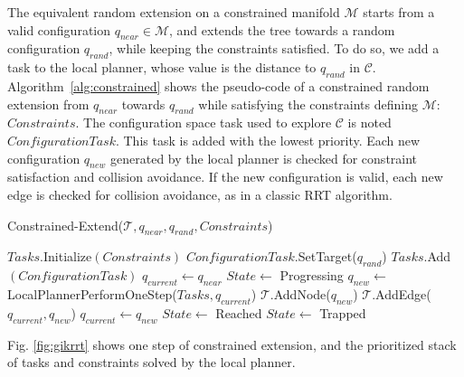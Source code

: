 \documentclass{article}
\begin{document}
The equivalent random  extension on a constrained manifold $\mathcal{M}$
starts from a valid configuration $q_{near} \in \mathcal{M}$, and extends the tree
towards a random configuration $q_{rand}$, while keeping the constraints
satisfied. To do so, we add a task to the local planner, whose value
is the distance to  $q_{rand}$ in $\mathcal{C}$. Algorithm~\ref{alg:constrained}
shows the pseudo-code of a constrained random extension from  $q_{near}$ towards
$q_{rand}$ while satisfying the constraints defining $\mathcal{M}$: $Constraints$.
The configuration space task used to explore $\mathcal{C}$ is 
noted $ConfigurationTask$.   This
task is added with the lowest priority. Each new configuration $q_{new}$ generated by the
local planner  is 
checked for constraint satisfaction and collision 
avoidance. If the new configuration is valid, each new edge is checked for collision
avoidance, as in a classic RRT algorithm.

\begin{algorithm}[h]
  \caption{Constrained-Extend($\mathcal{T},q_{near},q_{rand},Constraints$)}
  \label{alg:constrained}
  \begin{algorithmic}
    \STATE $Tasks.$Initialize$(Constraints)$
    \STATE $ConfigurationTask$.SetTarget($q_{rand}$)
    \STATE $Tasks.$Add$(ConfigurationTask)$
    \STATE $q_{current} \leftarrow q_{near}$
    \STATE $State \leftarrow$ Progressing
    \STATE $q_{new} \leftarrow $ LocalPlannerPerformOneStep($Tasks,q_{current}$)
    \STATE $\mathcal{T}$.AddNode($q_{new}$)
    \STATE $\mathcal{T}$.AddEdge($q_{current},q_{new}$)
    \STATE $q_{current} \leftarrow q_{new}$
    \STATE $State \leftarrow$ Reached
    \ENDIF
    \ELSE 
    \STATE $State \leftarrow$ Trapped
    \ENDIF
    \ENDWHILE

  \end{algorithmic}
\end{algorithm}



Fig. \ref{fig:gikrrt} shows one step of constrained
extension, and the prioritized stack of tasks and constraints solved by the local planner.
\end{document}
